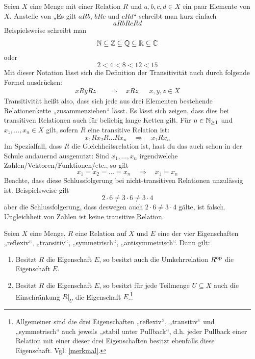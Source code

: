 \begin{bem} \label{kettenfalten}
    Seien $X$ eine Menge mit einer Relation $R$ und $a,b,c,d\in X$ ein paar Elemente von $X$. Anstelle von „Es gilt $aRb$, $bRc$ und $cRd$“ schreibt man kurz einfach
        \[ aRbRcRd \]
    Beispielsweise schreibt man
        \[ \mathbb N \subseteq \mathbb Z\subseteq\mathbb Q\subseteq\mathbb R\subseteq \mathbb C \]
    oder
        \[ 2 < 4 < 8 < 12 < 15 \]
    Mit dieser Notation lässt sich die Definition der Transitivität auch durch folgende Formel ausdrücken:
    \begin{align*}
        xRyRz \quad&\Rightarrow\quad xRz && x,y,z\in X
    \end{align*}
    Transitivität heißt also, dass sich jede aus drei Elementen bestehende Relationenkette „zusammenziehen“ lässt. Es lässt sich zeigen, dass dies bei transitiven Relationen auch für beliebig lange Ketten gilt. Für $n\in \mathbb N_{\ge 1}$ und $x_1,\dots , x_n\in X$ gilt, sofern $R$ eine transitive Relation ist:
        \[ x_1Rx_2R\ldots Rx_n \quad\Rightarrow\quad x_1Rx_n\]
    Im Spezialfall, dass $R$ die Gleichheitsrelation ist, hast du das auch schon in der Schule andauernd ausgenutzt: Sind $x_1,\dots , x_n$ irgendwelche Zahlen/Vektoren/Funktionen/etc., so gilt
        \[ x_1=x_2=\ldots = x_n \quad\Rightarrow\quad x_1=x_n\] 
    Beachte, dass diese Schlussfolgerung bei nicht-transitiven Relationen unzulässig ist. Beispielsweise gilt
        \[ 2\cdot 6 \neq 3\cdot 6\neq 3\cdot 4 \]
    aber die Schlussfolgerung, dass deswegen auch $2\cdot 6\neq 3\cdot 4$ gälte, ist falsch. Ungleichheit von Zahlen ist keine transitive Relation.
\end{bem}


\begin{satz} \label{releigstabil}
    Seien $X$ eine Menge, $R$ eine Relation auf $X$ und $E$ eine der vier Eigenschaften „reflexiv“, „transitiv“, „symmetrisch“, „antisymmetrisch“. Dann gilt:
    \begin{enumerate}
        \item Besitzt $R$ die Eigenschaft $E$, so besitzt auch die Umkehrrelation $R^{\mathrm{op}}$ die Eigenschaft $E$.
        \item Besitzt $R$ die Eigenschaft $E$, so besitzt für jede Teilmenge $U\subseteq X$ auch die Einschränkung $R\vert_U$ die Eigenschaft $E$.\footnote{Allgemeiner sind die drei Eigenschaften „reflexiv“, „transitiv“ und „symmetrisch“ auch jeweils „stabil unter Pullback“, d.h. jeder Pullback einer Relation mit einer dieser drei Eigenschaften besitzt ebenfalls diese Eigenschaft. Vgl. \cref{merkmal}.}
    \end{enumerate}
\end{satz}


